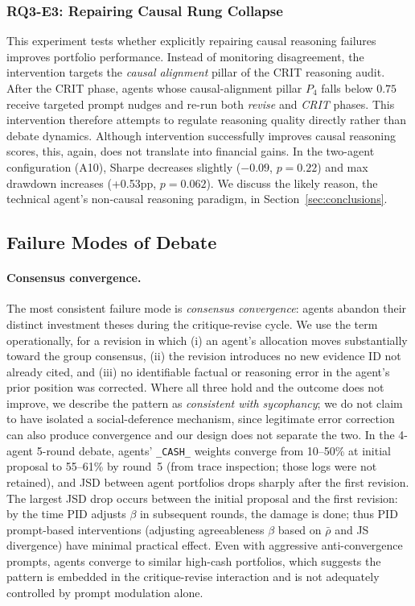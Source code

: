 \documentclass{article}
\begin{document}
\subsubsection{RQ3-E3: Repairing Causal Rung Collapse}
\vspace{-0.2cm}
This experiment tests whether explicitly repairing causal reasoning failures improves portfolio performance. Instead of monitoring disagreement, the intervention targets the \textit{causal alignment} pillar of the CRIT reasoning audit. After the CRIT phase, agents whose causal-alignment pillar $P_4$ falls below $0.75$ receive targeted prompt nudges and re-run both \textit{revise} and \textit{CRIT} phases. This intervention therefore attempts to regulate reasoning quality directly rather than debate dynamics. Although intervention successfully improves causal reasoning scores, this, again, does not translate into financial gains. In the two-agent configuration (A10), Sharpe decreases slightly ($-0.09$, $p=0.22$) and max drawdown increases (+0.53pp, $p=0.062$). We discuss the likely reason, the technical agent's non-causal reasoning paradigm, in Section~\ref{sec:conclusions}. 

\vspace{-0.3cm}


\subsection{Failure Modes of Debate}
\label{sec:failure-modes}
\paragraph{Consensus convergence.}
The most consistent failure mode is \emph{consensus convergence}: agents abandon their distinct investment theses during the critique-revise cycle. We use the term operationally, for a revision in which (i) an agent's allocation moves substantially toward the group consensus, (ii) the revision introduces no new evidence ID not already cited, and (iii) no identifiable factual or reasoning error in the agent's prior position was corrected. Where all three hold and the outcome does not improve, we describe the pattern as \emph{consistent with sycophancy}; we do not claim to have isolated a social-deference mechanism, since legitimate error correction can also produce convergence and our design does not separate the two. In the 4-agent 5-round debate, agents' \texttt{\_CASH\_} weights converge from 10--50\% at initial proposal to 55--61\% by round~5 (from trace inspection; those logs were not retained), and JSD between agent portfolios drops sharply after the first revision. The largest JSD drop occurs between the initial proposal and the first revision: by the time PID adjusts $\beta$ in subsequent rounds, the damage is done; thus PID prompt-based interventions (adjusting agreeableness $\beta$ based on $\bar{\rho}$ and JS divergence) have minimal practical effect. Even with aggressive anti-convergence prompts, agents converge to similar high-cash portfolios, which suggests the pattern is embedded in the critique-revise interaction and is not adequately controlled by prompt modulation alone.
\end{document}
